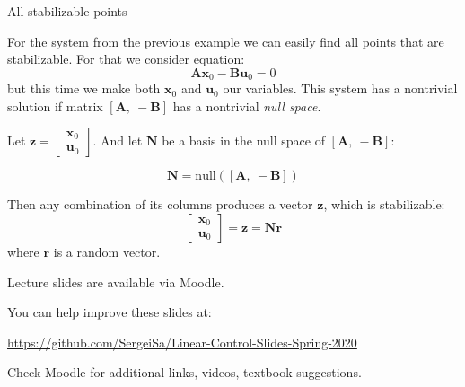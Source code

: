 \documentclass{beamer}
\begin{document}
\begin{frame}{All stabilizable points}
\begin{flushleft}

For the system from the previous example we can easily find all points that are stabilizable. For that we consider equation:
\[
\mathbf A \mathbf x_0 - \mathbf B \mathbf u_0 = 0
\]
but this time we make both $\mathbf x_0$ and $\mathbf u_0$ our variables. This system has a nontrivial solution if matrix $[\mathbf A, \ -\mathbf B]$ has a nontrivial \emph{null space}.

\bigskip

Let $\mathbf z = \begin{bmatrix} \mathbf x_0 \\ \mathbf u_0 \end{bmatrix}$. And let $\mathbf N$ be a basis in the null space of $[\mathbf A, \ -\mathbf B]$:

\[
\mathbf N = \text{null}([\mathbf A, \ -\mathbf B])
\]

Then any combination of its columns produces a vector $\mathbf z$, which is stabilizable:
\[
\begin{bmatrix} \mathbf x_0 \\ \mathbf u_0 \end{bmatrix} = \mathbf z = 
\mathbf N \mathbf r
\]
where $\mathbf r$ is a random vector.

\end{flushleft}
\end{frame}



\begin{frame}
\centerline{Lecture slides are available via Moodle.}
\bigskip
\centerline{You can help improve these slides at:}
\centerline{\url{https://github.com/SergeiSa/Linear-Control-Slides-Spring-2020}}
\bigskip
\centerline{Check Moodle for additional links, videos, textbook suggestions.}
\end{frame}
\end{document}
